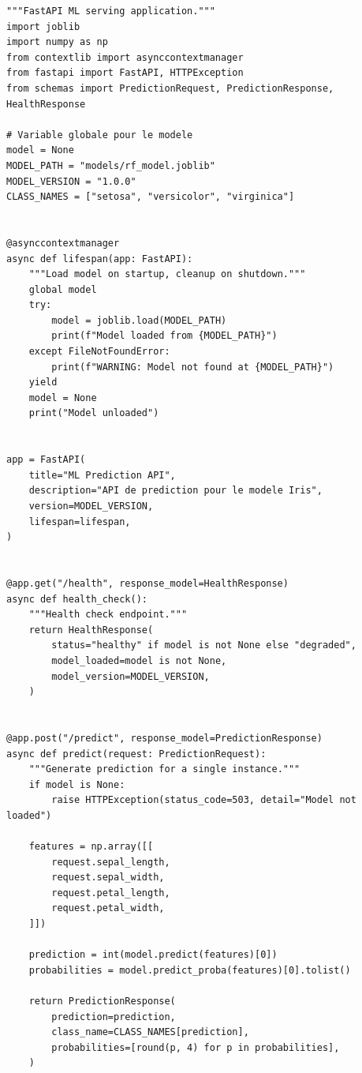\begin{codeblock}[title=\textbf{app.py --- API de serving ML compl\`ete}]
\begin{verbatim}
"""FastAPI ML serving application."""
import joblib
import numpy as np
from contextlib import asynccontextmanager
from fastapi import FastAPI, HTTPException
from schemas import PredictionRequest, PredictionResponse, HealthResponse

# Variable globale pour le modele
model = None
MODEL_PATH = "models/rf_model.joblib"
MODEL_VERSION = "1.0.0"
CLASS_NAMES = ["setosa", "versicolor", "virginica"]


@asynccontextmanager
async def lifespan(app: FastAPI):
    """Load model on startup, cleanup on shutdown."""
    global model
    try:
        model = joblib.load(MODEL_PATH)
        print(f"Model loaded from {MODEL_PATH}")
    except FileNotFoundError:
        print(f"WARNING: Model not found at {MODEL_PATH}")
    yield
    model = None
    print("Model unloaded")


app = FastAPI(
    title="ML Prediction API",
    description="API de prediction pour le modele Iris",
    version=MODEL_VERSION,
    lifespan=lifespan,
)


@app.get("/health", response_model=HealthResponse)
async def health_check():
    """Health check endpoint."""
    return HealthResponse(
        status="healthy" if model is not None else "degraded",
        model_loaded=model is not None,
        model_version=MODEL_VERSION,
    )


@app.post("/predict", response_model=PredictionResponse)
async def predict(request: PredictionRequest):
    """Generate prediction for a single instance."""
    if model is None:
        raise HTTPException(status_code=503, detail="Model not loaded")

    features = np.array([[
        request.sepal_length,
        request.sepal_width,
        request.petal_length,
        request.petal_width,
    ]])

    prediction = int(model.predict(features)[0])
    probabilities = model.predict_proba(features)[0].tolist()

    return PredictionResponse(
        prediction=prediction,
        class_name=CLASS_NAMES[prediction],
        probabilities=[round(p, 4) for p in probabilities],
    )
\end{verbatim}
\end{codeblock}

